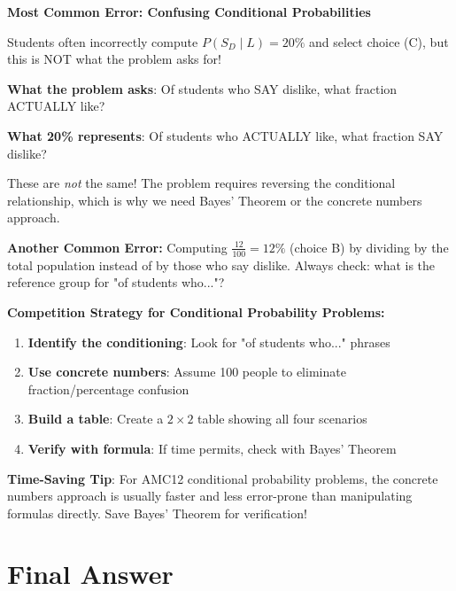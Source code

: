 \documentclass[]{article}
\begin{document}
\begin{warningbox}
\textbf{Most Common Error: Confusing Conditional Probabilities}

Students often incorrectly compute $P(S_D \mid L) = 20\%$ and select choice (C), but this is NOT what the problem asks for!

\vspace{0.5em}
\textbf{What the problem asks}: Of students who SAY dislike, what fraction ACTUALLY like?

\textbf{What 20\% represents}: Of students who ACTUALLY like, what fraction SAY dislike?

\vspace{0.5em}
These are \textit{not} the same! The problem requires reversing the conditional relationship, which is why we need Bayes' Theorem or the concrete numbers approach.

\vspace{0.5em}
\textbf{Another Common Error:} Computing $\frac{12}{100} = 12\%$ (choice B) by dividing by the total population instead of by those who say dislike. Always check: what is the reference group for "of students who..."?
\end{warningbox}

\begin{tipbox}
\textbf{Competition Strategy for Conditional Probability Problems:}

\begin{enumerate}
    \item \textbf{Identify the conditioning}: Look for "of students who..." phrases
    \item \textbf{Use concrete numbers}: Assume 100 people to eliminate fraction/percentage confusion
    \item \textbf{Build a table}: Create a $2 \times 2$ table showing all four scenarios
    \item \textbf{Verify with formula}: If time permits, check with Bayes' Theorem
\end{enumerate}

\textbf{Time-Saving Tip}: For AMC12 conditional probability problems, the concrete numbers approach is usually faster and less error-prone than manipulating formulas directly. Save Bayes' Theorem for verification!
\end{tipbox}

\section*{Final Answer}
\end{document}
